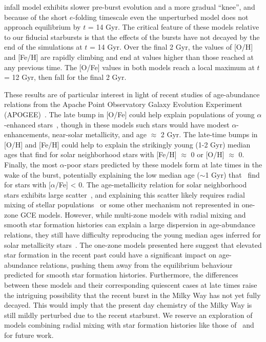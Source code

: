 infall model exhibits slower pre-burst evolution and a more gradual ``knee'', 
and because of the short $e$-folding timescale even the unperturbed model does 
not approach equilibrium by $t$ = 14 Gyr. The critical feature of these models 
relative to our fiducial starbursts is that the effects of the bursts have not 
decayed by the end of the simulations at $t$ = 14 Gyr. Over the final 2 Gyr, 
the values of [O/H] and [Fe/H] are rapidly climbing and end at values higher 
than those reached at any previous time. The [O/Fe] values in both models 
reach a local maximum at $t$ = 12 Gyr, then fall for the final 2 Gyr. 
\par 
These results are of particular interest in light of recent 
studies of age-abundance relations from the Apache Point Observatory Galaxy 
Evolution Experiment (APOGEE)~\citep[e.g.][]{Martig2016,
SilvaAguirre2018, Feuillet2018, Feuillet2019}. The late bump in [O/Fe] could 
help explain populations of young $\alpha$-enhanced stars~\citep{Martig2016, 
Feuillet2019}, though in these models such stars would have modest 
$\alpha$-enhancements, 
near-solar metallicity, and age $\approx$ 2 Gyr. The late-time bumps in [O/H] 
and [Fe/H] could help to explain the strikingly young (1-2 Gyr) median ages that 
\citet{Feuillet2018} find for solar neighborhood stars with [Fe/H] $\approx$ 
0 or [O/H] $\approx$ 0. Finally, the most $\alpha$-poor stars predicted by 
these models form at late times in the wake of the burst, potentially 
explaining the low median age ($\sim$1 Gyr) that~\citet{Feuillet2018} find for 
stars with [$\alpha$/Fe] < 0. The age-metallicity relation 
for solar neighborhood stars exhibits large scatter~\citep{Edvardsson1993}, 
and explaining this scatter likely requires radial mixing of stellar 
populations~\citep[e.g.][]{Schoenrich2009a} or some other mechanism not 
represented in one-zone GCE models. However, while multi-zone models with 
radial mixing and smooth star formation histories can explain a large 
dispersion in age-abundance relations, they still have difficulty reproducing 
the young median ages inferred for solar metallicity stars~\citep[][see 
their Fig. 15]{Feuillet2018}. 
The one-zone models presented here suggest that elevated star formation in the 
recent past could have a significant impact on age-abundance relations, 
pushing them away from the equilibrium behaviour predicted for smooth star 
formation histories. Furthermore, the differences between these models and 
their corresponding quiescent cases at late times raise the intriguing 
possibility that the recent burst in the Milky Way has not yet fully decayed. 
This would imply that the present day chemistry of the Milky Way is still 
mildly perturbed due to the recent starburst. We reserve an exploration of 
models combining radial mixing with star formation histories like those 
of~\citet{Mor2019} and~\citet{Isern2019} for future work.

